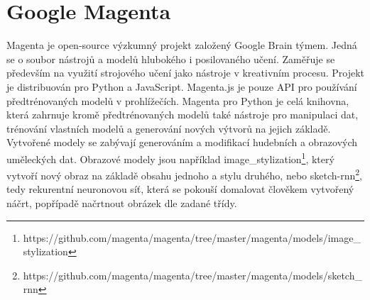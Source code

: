 \section{Google Magenta}
Magenta je open-source výzkumný projekt založený Google Brain týmem.
Jedná se o soubor nástrojů a modelů hlubokého i posilovaného učení.
Zaměřuje se především na využití strojového učení jako nástroje
v kreativním procesu.
Projekt je distribuován pro Python a JavaScript.
Magenta.js je pouze API pro používání předtrénovaných modelů v prohlížečích.
Magenta pro Python je celá knihovna, která zahrnuje kromě předtrénovaných modelů
také nástroje pro manipulaci dat, trénování vlastních modelů a generování
nových výtvorů na jejich základě.
\cite{google_magentaHome} 
Vytvořené modely se zabývají generováním a modifikací hudebních 
a obrazových uměleckých dat.
Obrazové modely jsou například image\_stylization\footnote{https://github.com/magenta/magenta/tree/master/magenta/models/image\_stylization},
který vytvoří nový obraz na základě obsahu jednoho a stylu druhého\cite{dumoulin2017learned},
nebo sketch-rnn\footnote{https://github.com/magenta/magenta/tree/master/magenta/models/sketch\_rnn},
tedy rekurentní neuronovou síť, která se pokouší domalovat člověkem vytvořený náčrt,
popřípadě načrtnout obrázek dle zadané třídy\cite{ha2017neural}.
\par

